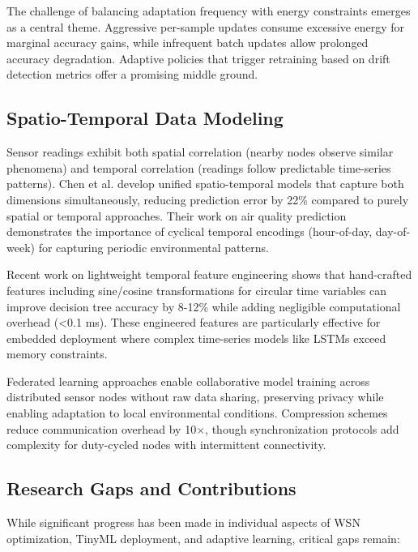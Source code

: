 \documentclass[12pt,a4paper]{article}
\begin{document}
The challenge of balancing adaptation frequency with energy constraints emerges as a central theme. Aggressive per-sample updates consume excessive energy for marginal accuracy gains, while infrequent batch updates allow prolonged accuracy degradation. Adaptive policies that trigger retraining based on drift detection metrics offer a promising middle ground.

\subsection{Spatio-Temporal Data Modeling}

Sensor readings exhibit both spatial correlation (nearby nodes observe similar phenomena) and temporal correlation (readings follow predictable time-series patterns). Chen et al. \cite{Chen2023SpatioTemporal} develop unified spatio-temporal models that capture both dimensions simultaneously, reducing prediction error by 22\% compared to purely spatial or temporal approaches. Their work on air quality prediction demonstrates the importance of cyclical temporal encodings (hour-of-day, day-of-week) for capturing periodic environmental patterns.

Recent work on lightweight temporal feature engineering shows that hand-crafted features including sine/cosine transformations for circular time variables can improve decision tree accuracy by 8-12\% while adding negligible computational overhead (<0.1 ms). These engineered features are particularly effective for embedded deployment where complex time-series models like LSTMs exceed memory constraints.

Federated learning approaches \cite{Zhang2024FederatedEdge} enable collaborative model training across distributed sensor nodes without raw data sharing, preserving privacy while enabling adaptation to local environmental conditions. Compression schemes reduce communication overhead by 10$\times$, though synchronization protocols add complexity for duty-cycled nodes with intermittent connectivity.

\subsection{Research Gaps and Contributions}

While significant progress has been made in individual aspects of WSN optimization, TinyML deployment, and adaptive learning, critical gaps remain:
\end{document}
